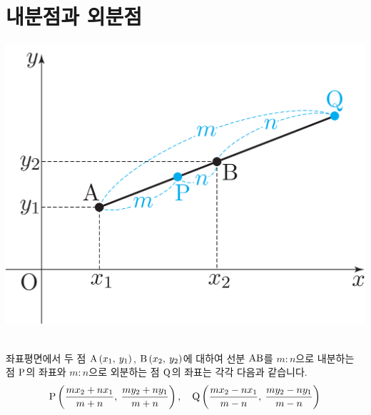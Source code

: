 \section{내분점과 외분점}
\begin{center}
\includegraphics[scale=0.125]{pic0/pic145.pdf}\
\end{center}좌표평면에서 두 점 $\xy[A]{x_1}{y_1}$, $\xy[B]{x_2}{y_2}$에 대하여 선분 $\mrm{AB}$를 $m:n$으로 내분하는 점 $\mrm{P}$의 좌표와 $m:n$으로 외분하는 점 $\mrm{Q}$의 좌표는 각각 다음과 같습니다.\\[-1em]
\begin{align*}
  \xy[P]{\IDP{x_1}{x_2}{m}{n}}{\IDP{y_1}{y_2}{m}{n}},\quad
  \xy[Q]{\EDP{x_1}{x_2}{m}{n}}{\EDP{y_1}{y_2}{m}{n}}
\end{align*}\\[-4.5em]

